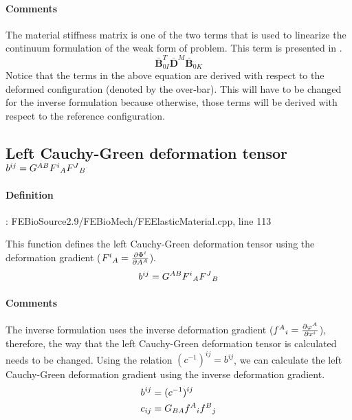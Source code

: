 \documentclass{article}
\begin{document}
    \paragraph{Comments}
    The material stiffness matrix is one of the two terms that is used to linearize the continuum formulation of the weak form of problem. This term is presented in \cite[pg. 138, eq 4.109]{wriggers_nonlinear_2008}.
    \begin{equation*}
        \bar{\bm{B}}_{0I}^T \bar{\bm{D}}^M \bar{\bm{B}}_{0K}
    \end{equation*}
    Notice that the terms in the above equation are derived with respect to the deformed configuration (denoted by the over-bar). This will have to be changed for the inverse formulation because otherwise, those terms will be derived with respect to the reference configuration.

\subsection*{Left Cauchy-Green deformation tensor $b^{ij} = G^{AB}F^i\mathstrut_A F^J\mathstrut_B$}

    \paragraph{Definition}: FEBioSource2.9/FEBioMech/FEElasticMaterial.cpp, line 113

    This function defines the left Cauchy-Green deformation tensor using the deformation gradient ($F^i\mathstrut_A = \frac{\partial \Phi^i}{\partial A^A}$).
    \begin{equation*}
        b^{ij} =  G^{AB}F^i\mathstrut_A F^J\mathstrut_B
    \end{equation*}

    \paragraph{Comments}
    The inverse formulation uses the inverse deformation gradient ($f^A\mathstrut_i = \frac{\partial \varphi^A}{\partial x^i}$), therefore, the way that the left Cauchy-Green deformation tensor is calculated needs to be changed. Using the relation $(c^{-1})^{ij} = b^{ij}$, we can calculate the left Cauchy-Green deformation gradient using the inverse deformation gradient.
    \begin{equation*}
        \begin{split}
            b^{ij} &= (c^{-1})^{ij} \\
            c_{ij} &= G_{BA}f^A\mathstrut_i f^B\mathstrut_j
        \end{split}
    \end{equation*}
\end{document}
